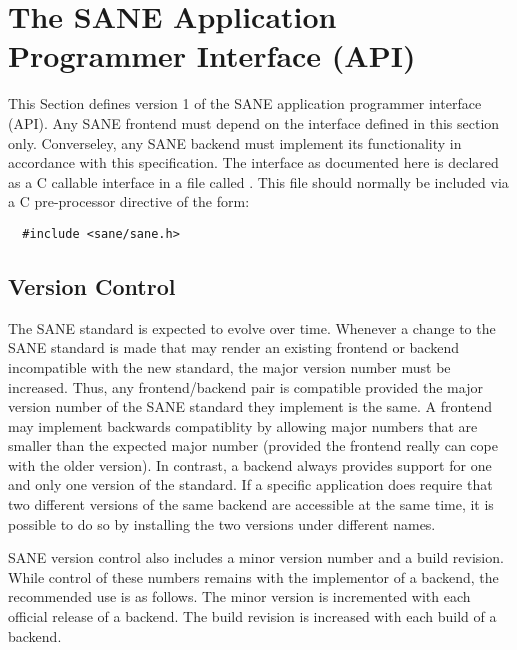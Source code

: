\documentclass[11pt,DVIps]{report}
\begin{document}
\chapter{The SANE Application Programmer Interface (API)}\label{chap:api}

This Section defines version 1 of the SANE application
programmer interface (API).  Any SANE frontend must depend on the
interface defined in this section only.  Converseley, any SANE backend
must implement its functionality in accordance with this
specification.  The interface as documented here is declared as a C
callable interface in a file called .  This file should
normally be included via a C pre-processor directive of the form:
\begin{verbatim}
  #include <sane/sane.h>
\end{verbatim}


\section{Version Control}

The SANE standard is expected to evolve over time.  Whenever a change
to the SANE standard is made that may render an existing frontend or
backend incompatible with the new standard, the major version number
must be increased.  Thus, any frontend/backend pair is compatible
provided the major version number of the SANE standard they implement
is the same.  A frontend may implement backwards compatiblity by
allowing major numbers that are smaller than the expected major number
(provided the frontend really can cope with the older version).  In
contrast, a backend always provides support for one and only one
version of the standard.  If a specific application does require that
two different versions of the same backend are accessible at the same
time, it is possible to do so by installing the two versions under
different names.

SANE version control also includes a minor version number and a build
revision.  While control of these numbers remains with the implementor
of a backend, the recommended use is as follows.  The minor version is
incremented with each official release of a backend.  The build
revision is increased with each build of a backend.
\end{document}
